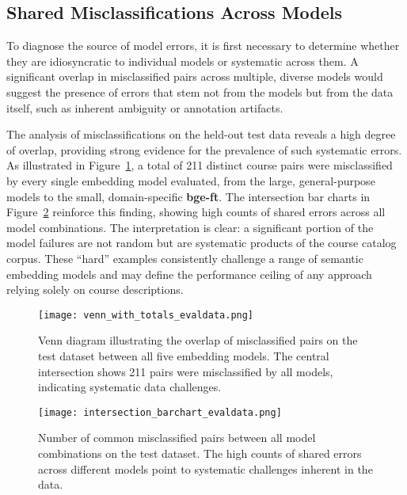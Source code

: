 \subsection{Shared Misclassifications Across Models}\label{ch:4.6.1}
To diagnose the source of model errors, it is first necessary to determine whether they are idiosyncratic to individual models or systematic across them. A significant overlap in misclassified pairs across multiple, diverse models would suggest the presence of errors that stem not from the models but from the data itself, such as inherent ambiguity or annotation artifacts.

The analysis of misclassifications on the held-out test data reveals a high degree of overlap, providing strong evidence for the prevalence of such systematic errors. As illustrated in Figure~\ref{fig:venn_misclassified}, a total of 211 distinct course pairs were misclassified by every single embedding model evaluated, from the large, general-purpose models to the small, domain-specific \textbf{bge-ft}. The intersection bar charts in Figure~\ref{fig:intersection_barchart} reinforce this finding, showing high counts of shared errors across all model combinations. The interpretation is clear: a significant portion of the model failures are not random but are systematic products of the course catalog corpus. These ``hard'' examples consistently challenge a range of semantic embedding models and may define the performance ceiling of any approach relying solely on course descriptions.
\begin{figure}[tb]
\centering
\texttt{[image: venn\_with\_totals\_evaldata.png]}
\caption{Venn diagram illustrating the overlap of misclassified pairs on the test dataset between all five embedding models. The central intersection shows 211 pairs were misclassified by all models, indicating systematic data challenges.}
\label{fig:venn_misclassified}
\end{figure}
\begin{figure}[tb]
\centering
\texttt{[image: intersection\_barchart\_evaldata.png]}
\caption{Number of common misclassified pairs between all model combinations on the test dataset. The high counts of shared errors across different models point to systematic challenges inherent in the data.}
\label{fig:intersection_barchart}
\end{figure}


